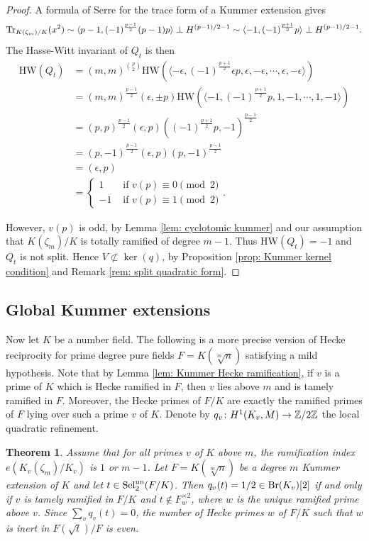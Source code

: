 \documentclass[11pt,a4paper]{amsart}
\def\Z{{\rm \mathbb{Z}}}
\def\un{{\rm un}}
\def\Tr{{\rm Tr}}
\def\Br{{\rm Br}}
\def\Sel{{\rm Sel}}
\numberwithin{equation}{section}
\newtheorem{theorem}{Theorem}[section]
\begin{document}
\begin{proof}
    A formula of Serre \cite[pg. 672]{SerreWittInvariant84} for the trace form of a Kummer extension gives 
    \[\Tr_{K(\zeta_m)/K}(x^2) \sim \langle p-1, (-1)^{\frac{p-1}{2}}(p-1)p\rangle \perp H^{(p-1)/2 - 1} \sim \langle -1,(-1)^{\frac{p+1}{2}}p\rangle \perp H^{(p-1)/2 - 1}.\]
    The Hasse-Witt invariant of $Q_t$ is then 
    \begin{align*}
    \mathrm{HW}(Q_t) &= (m,m)^{\binom{p}{2}}\mathrm{HW}(\langle -\epsilon, (-1)^{\frac{p+1}{2}}\epsilon p, \epsilon, -\epsilon,\cdots, \epsilon, -\epsilon\rangle)\\
    &=  (m,m)^{\frac{p-1}{2}} (\epsilon, \pm p)\mathrm{HW}(\langle -1,(-1)^{\frac{p+1}{2}}p,1,-1,\cdots, 1,-1\rangle)\\
    &=(p,p)^{\frac{p-1}{2}} (\epsilon, p)((-1)^{\frac{p+1}{2}}p,-1)^{\frac{p-1}{2}}\\
    &= (p,-1)^{\frac{p-1}{2}} (\epsilon, p)(p,-1)^{\frac{p-1}{2}}\\
    &= (\epsilon,p)\\
    &=\begin{cases}
        1 & \mbox{ if } v(p) \equiv 0\pmod{2}\\
        -1 & \mbox{ if } v(p) \equiv 1\pmod{2}
    \end{cases}.
    \end{align*}

    However, $v(p)$ is odd, by Lemma \ref{lem: cyclotomic kummer} and our assumption that $K(\zeta_m)/K$ is totally ramified of degree $m-1$.  Thus $\mathrm{HW}(Q_t) = -1$ and $Q_t$ is not split.  Hence $V \not\subset \ker(q)$, by Proposition \ref{prop: Kummer kernel condition} and Remark \ref{rem: split quadratic form}. 
\end{proof}


\subsection{Global Kummer extensions}
Now  let $K$ be a number field.  The following is a more precise version of Hecke reciprocity for prime degree pure fields $F = K(\sqrt[m]{n})$ satisfying a mild hypothesis. Note that by Lemma \ref{lem: Kummer Hecke ramification}, if $v$ is a prime of $K$ which is Hecke ramified in $F$, then $v$ lies above $m$ and is tamely ramified in $F$. Moreover, the Hecke primes of $F/K$ are exactly the ramified primes of $F$ lying over such a prime $v$ of $K$.  Denote by $q_v \colon H^1(K_v, M) \to \Z/2\Z$ the local quadratic refinement.


\begin{theorem}\label{thm: global Kummer reciprocity law}
    Assume that for all primes $v$ of $K$ above $m$, the ramification index $e(K_v(\zeta_m)/K_v)$ is $1$ or $m-1$.  Let $F = K(\sqrt[m]{n})$ be a degree $m$ Kummer extension of $K$ and let $t \in \Sel_2^\un(F/K)$. Then $q_v(t) = 1/2 \in \Br(K_v)[2]$ if and only if $v$ is tamely ramified in $F/K$ and $t \notin F_w^{\times 2}$, where $w$ is the unique ramified prime above $v$. Since $\sum_v q_v(t) = 0$, the number of Hecke primes $w$ of $F/K$ such that $w$ is inert in $F(\sqrt{t})/F$ is even.
\end{theorem}
\end{document}
